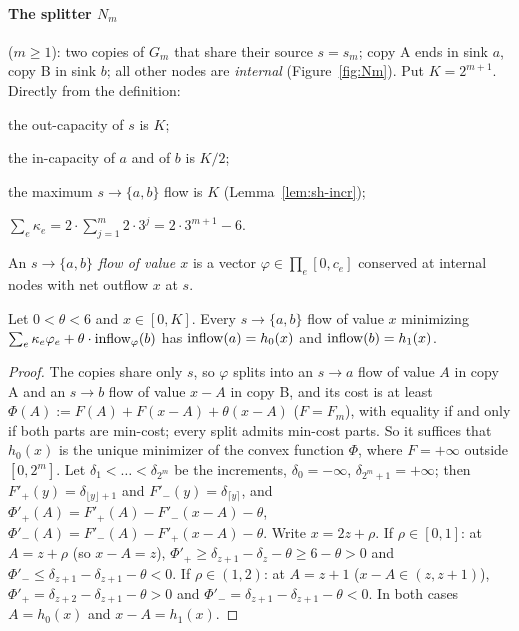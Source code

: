 \paragraph{The splitter $N_m$} ($m\ge1$): two copies of $G_m$ that share their source $s=s_m$; copy A ends
in sink $a$, copy B in sink $b$; all other nodes are \emph{internal} (Figure~\ref{fig:Nm}). Put
$K=2^{m+1}$. Directly from the definition:
\begin{description}[leftmargin=2.5em,itemsep=0pt]
\item[(N1)] the out-capacity of $s$ is $K$;
\item[(N2)] the in-capacity of $a$ and of $b$ is $K/2$;
\item[(N3)] the maximum $s\to\{a,b\}$ flow is $K$ (Lemma~\ref{lem:sh-incr});
\item[(N4)] $\sum_e\kappa_e=2\cdot\sum_{j=1}^m2\cdot3^j=2\cdot3^{m+1}-6$.
\end{description}
An \emph{$s\to\{a,b\}$ flow of value $x$} is a vector $\varphi\in\prod_e[0,c_e]$ conserved at internal
nodes with net outflow $x$ at $s$.

\begin{lemma}[Alternation]\label{lem:sh-alt}
\statuslean
Let $0<\theta<6$ and $x\in[0,K]$. Every $s\to\{a,b\}$ flow of value $x$ minimizing
$\sum_e\kappa_e\varphi_e+\theta\cdot\mathrm{inflow}_\varphi(b)$ has $\mathrm{inflow}(a)=h_0(x)$ and $\mathrm{inflow}(b)=h_1(x)$.
\end{lemma}

\begin{proof}
The copies share only $s$, so $\varphi$ splits into an $s\to a$ flow of value $A$ in copy A and an $s\to
b$ flow of value $x-A$ in copy B, and its cost is at least $\Phi(A):=F(A)+F(x-A)+\theta(x-A)$ ($F=F_m$),
with equality if and only if both parts are min-cost; every split admits min-cost parts. So it suffices
that $h_0(x)$ is the unique minimizer of the convex function $\Phi$, where $F=+\infty$ outside $[0,2^m]$.
Let $\delta_1<\dots<\delta_{2^m}$ be the increments, $\delta_0=-\infty$, $\delta_{2^m+1}=+\infty$; then
$F'_+(y)=\delta_{\lfloor y\rfloor+1}$ and $F'_-(y)=\delta_{\lceil y\rceil}$, and
$\Phi'_+(A)=F'_+(A)-F'_-(x-A)-\theta$, $\Phi'_-(A)=F'_-(A)-F'_+(x-A)-\theta$. Write $x=2z+\rho$. If
$\rho\in[0,1]$: at $A=z+\rho$ (so $x-A=z$), $\Phi'_+\ge\delta_{z+1}-\delta_z-\theta\ge6-\theta>0$ and
$\Phi'_-\le\delta_{z+1}-\delta_{z+1}-\theta<0$. If $\rho\in(1,2)$: at $A=z+1$ ($x-A\in(z,z+1)$),
$\Phi'_+=\delta_{z+2}-\delta_{z+1}-\theta>0$ and $\Phi'_-=\delta_{z+1}-\delta_{z+1}-\theta<0$. In both cases
$A=h_0(x)$ and $x-A=h_1(x)$.
\end{proof}

